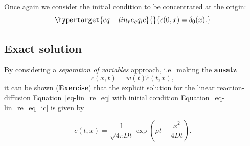 \documentclass[
  letterpaper,
  DIV=11,
  numbers=noendperiod]{scrreprt}
\theoremstyle{plain}
\theoremstyle{definition}
\theoremstyle{plain}
\theoremstyle{remark}
\begin{document}
Once again we consider the initial condition to be concentrated at the
origin: \begin{equation}\protect\hypertarget{eq-lin_re_eq_ic}{}{
c(0,x) = \delta_0(x).
}\label{eq-lin_re_eq_ic}\end{equation}

\hypertarget{exact-solution}{%
\subsection{Exact solution}\label{exact-solution}}

By considering a \emph{separation of variables} approach, i.e.~making
the \textbf{ansatz} \[
c(x,t) = w(t) \tilde c(t,x),
\] it can be shown (\textbf{Exercise}) that the explicit solution for
the linear reaction-diffusion Equation~\ref{eq-lin_re_eq} with initial
condition Equation~\ref{eq-lin_re_eq_ic} is given by

\[
c(t,x) = \frac1{\sqrt{4 \pi D t}} \exp \left(\rho t - \frac{x^2}{ 4Dt} \right).
\]
\end{document}
